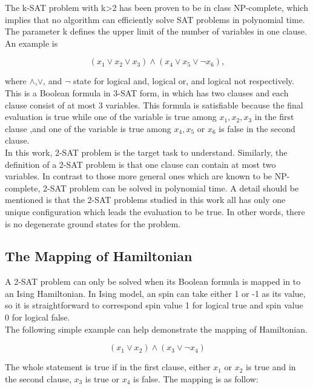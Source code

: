 \documentclass[twoside,a4paper,article]{combine}
\begin{document}
The k-SAT problem with k>2 has been proven to be in class NP-complete, which implies that no algorithm can efficiently solve SAT problems in polynomial time. The parameter k defines the upper limit of the number of variables in one clause. An example is 

\begin{equation*}
 (x_1\lor x_2\lor x_3)\land (x_4\lor x_5\lor \neg x_6),
\end{equation*}

where $\land$,$\lor$, and $\neg$ state for logical and, logical or, and logical not respectively. This is a Boolean formula in 3-SAT form, in which has two clauses and each clause consist of at most 3 variables. This formula is satisfiable because the final evaluation is true while one of the variable is true among $x_1, x_2, x_3$ in the first clause ,and one of the variable is true among $x_4, x_5$ or $x_6$ is false in the second clause. \\

In this work, 2-SAT problem is the target task to understand. Similarly, the definition of a 2-SAT problem is that one clause can contain at most two variables. In contrast to those more general ones which are known to be NP-complete, 2-SAT problem can be solved in polynomial time. A detail should be mentioned is that the 2-SAT problems studied in this work all has only one unique configuration which leads the evaluation to be true. In other words, there is no degenerate ground states for the problem. \\
 
\subsection{The Mapping of Hamiltonian}
\label{The Mapping of Hamiltonian}

A 2-SAT problem can only be solved when its Boolean formula is mapped in to an Ising Hamiltonian. In Ising model, an spin can take either 1 or -1 as its value, so it is straightforward to correspond spin value 1 for logical true and spin value 0 for logical false. \\

The following simple example can help demonstrate the mapping of Hamiltonian. 

\begin{equation*}
(x_1\lor x_2)\land (x_3\lor \neg x_4)
\end{equation*}

The whole statement is true if in the first clause, either $x_1$ or $x_2$ is true and in the second clause, $x_3$ is true or $x_4$ is false. The mapping is as follow:
\end{document}
